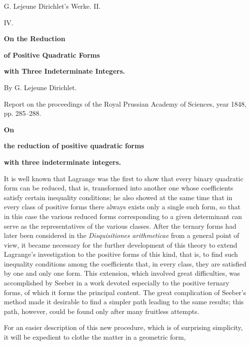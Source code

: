 \documentclass[11pt]{article}
\begin{document}
\begin{center}
{\Large G. Lejeune Dirichlet's Werke. II.}\par\vspace{1.5em}
{\Large IV.}\par\vspace{0.5em}
{\LARGE \textbf{On the Reduction}}\par
{\LARGE \textbf{of Positive Quadratic Forms}}\par
{\LARGE \textbf{with Three Indeterminate Integers.}}\par\vspace{1em}
{\large By G. Lejeune Dirichlet.}\par\vspace{0.5em}
{\small Report on the proceedings of the Royal Prussian Academy of Sciences, year 1848, pp. 285--288.}
\end{center}

\begin{center}
\textbf{On}\par
\textbf{the reduction of positive quadratic forms}\par
\textbf{with three indeterminate integers.}
\end{center}

It is well known that Lagrange was the first to show that every binary quadratic form can be reduced, that is, transformed into another one whose coefficients satisfy certain inequality conditions; he also showed at the same time that in every class of positive forms there always exists only a single such form, so that in this case the various reduced forms corresponding to a given determinant can serve as the representatives of the various classes. After the ternary forms had later been considered in the \emph{Disquisitiones arithmeticae} from a general point of view, it became necessary for the further development of this theory to extend Lagrange's investigation to the positive forms of this kind, that is, to find such inequality conditions among the coefficients that, in every class, they are satisfied by one and only one form. This extension, which involved great difficulties, was accomplished by Seeber in a work devoted especially to the positive ternary forms, of which it forms the principal content. The great complication of Seeber's method made it desirable to find a simpler path leading to the same results; this path, however, could be found only after many fruitless attempts.

For an easier description of this new procedure, which is of surprising simplicity, it will be expedient to clothe the matter in a geometric form,
\end{document}
